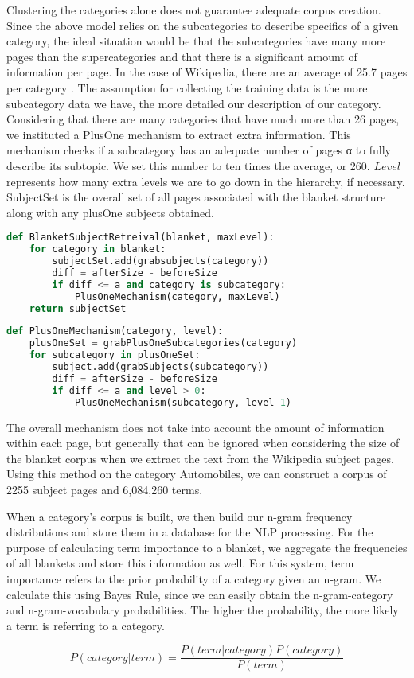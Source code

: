 Clustering the categories alone does not guarantee adequate corpus
creation. Since the above model relies on the subcategories to
describe specifics of a given category, the ideal situation would be
that the subcategories have many more pages than the supercategories
and that there is a significant amount of information per page.  In
the case of Wikipedia, there are an average of 25.7 pages per category
\cite{1321474}. The assumption for collecting the training data is the
more subcategory data we have, the more detailed our description of
our category. Considering that there are many categories that have
much more than 26 pages, we instituted a PlusOne mechanism to extract
extra information. This mechanism checks if a subcategory has an
adequate number of pages α to fully describe its subtopic. We set this
number to ten times the average, or 260. $Level$ represents how many
extra levels we are to go down in the hierarchy, if
necessary. SubjectSet is the overall set of all pages associated with
the blanket structure along with any plusOne subjects obtained.

\begin{lstlisting}[language=Python,frame=none,tabsize=2,caption=BlanketSubjectRetreival,label=BlanketSubjectRetreival,basicstyle=\small]
def BlanketSubjectRetreival(blanket, maxLevel):
	for category in blanket:
		subjectSet.add(grabsubjects(category))
		diff = afterSize - beforeSize
		if diff <= a and category is subcategory:
			PlusOneMechanism(category, maxLevel)
	return subjectSet
\end{lstlisting}

\begin{lstlisting}[language=Python,frame=none,tabsize=2,caption=PlusOneMechanism, label=PlusOneMechanism,basicstyle=\small]
def PlusOneMechanism(category, level):
	plusOneSet = grabPlusOneSubcategories(category)
	for subcategory in plusOneSet:
		subject.add(grabSubjects(subcategory))
		diff = afterSize - beforeSize
		if diff <= a and level > 0:
			PlusOneMechanism(subcategory, level-1)


\end{lstlisting}

The overall mechanism does not take into account the amount of
information within each page, but generally that can be ignored when
considering the size of the blanket corpus when we extract the text
from the Wikipedia subject pages. Using this method on the category
Automobiles, we can construct a corpus of 2255 subject pages and
6,084,260 terms.

When a category's corpus is built, we then build our n-gram frequency
distributions and store them in a database for the NLP processing. For
the purpose of calculating term importance to a blanket, we aggregate
the frequencies of all blankets and store this information as
well. For this system, term importance refers to the prior probability
of a category given an n-gram. We calculate this using Bayes Rule,
since we can easily obtain the n-gram-category and n-gram-vocabulary
probabilities. The higher the probability, the more likely a term is
referring to a category.

\begin{equation}
P (category | term) = \frac{P(term | category) P(category)}{P(term)}
\end{equation}
